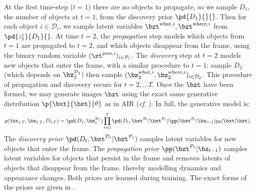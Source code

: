 At the first time-step ($t = 1$) there are no objects to propagate, so we sample $D_1$, the number of objects at $t=1$, from the discovery prior $\pd{D_1}{}{}$. 
Then for each object $i \in \mathcal{D}_t$, we sample latent variables $\bzt^{\mathrm{what}, i}, \bzt^{\mathrm{where}, i}$ from $\pd{z_1^i}{D_1}{}$. 
At time $t=2$, the \textit{propagation} step models which objects from $t=1$ are propagated to $t=2$, and which objects disappear from the frame, using the binary random variable $(\zt^{\mathrm{pres},i})_{i \in \mathcal{P}_t}$. 
The \textit{discovery} step at $t=2$ models new objects that enter the frame, with a similar procedure to $t=1$: sample $D_2$ (which depends on $\bz_2^{\mathcal{P}_2}$) then sample $(\bz_2^{\mathrm{what}, i}, \bz_2^{\mathrm{where}, i})_{i\in \mathcal{D}_2}$. 
This procedure of propagation and discovery recurs for $t = 2, \ldots T$.
Once the $\bzt$ have been formed, we may generate images $\bxt$ using the exact same generative distribution $\p{\bxt}{\bzt}{\theta}$ as in \gls{AIR} (\textit{cf}. ). 
In full, the generative model is:
\begin{equation} \label{eq:full_joint}
p(\bx_{1:T},\bz_{1:T},D_{1:T}) 
    = \pd(D_1,\bz_1^{\mathcal{D}_1}) \prod_{t=2}^T \pd(D_t,\bzt^{\mathcal{D}_t}|\bzt^{\mathcal{P}_t})\pp(\bzt^{\mathcal{P}_t}|\bz_{t-1}) p_{\theta}(\bxt|\bzt),
\end{equation}
The \textit{discovery prior} $\pd(D_t,\bzt^{\mathcal{D}_t}|\bzt^{\mathcal{P}_t})$ samples latent variables for new objects that enter the frame. The \textit{propagation prior} $\pp(\bzt^{\mathcal{P}_t}|\bz_{t-1})$ samples latent variables for objects that persist in the frame and removes latents of objects that disappear from the frame, thereby modelling dynamics and appearance changes. Both priors are learned during training. The exact forms of the priors are given in .
